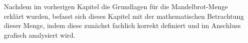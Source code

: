 
Nachdem im vorherigen Kapitel die Grundlagen für die Mandelbrot-Menge
erklärt wurden, befasst sich dieses Kapitel mit der mathematischen Betrachtung
dieser Menge, indem diese zunächst fachlich korrekt definiert und
im Anschluss grafisch analysiert wird.



